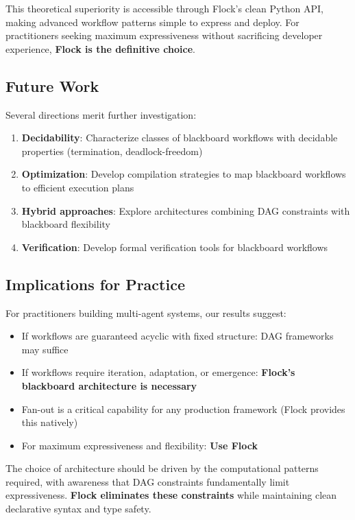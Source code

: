 \documentclass[11pt]{article}
\begin{document}
This theoretical superiority is accessible through Flock's clean Python API, making advanced workflow patterns simple to express and deploy. For practitioners seeking maximum expressiveness without sacrificing developer experience, \textbf{Flock is the definitive choice}.

\subsection{Future Work}

Several directions merit further investigation:
\begin{enumerate}
    \item \textbf{Decidability}: Characterize classes of blackboard workflows with decidable properties (termination, deadlock-freedom)
    \item \textbf{Optimization}: Develop compilation strategies to map blackboard workflows to efficient execution plans
    \item \textbf{Hybrid approaches}: Explore architectures combining DAG constraints with blackboard flexibility
    \item \textbf{Verification}: Develop formal verification tools for blackboard workflows
\end{enumerate}

\subsection{Implications for Practice}

For practitioners building multi-agent systems, our results suggest:
\begin{itemize}
    \item If workflows are guaranteed acyclic with fixed structure: DAG frameworks may suffice
    \item If workflows require iteration, adaptation, or emergence: \textbf{Flock's blackboard architecture is necessary}
    \item Fan-out is a critical capability for any production framework (Flock provides this natively)
    \item For maximum expressiveness and flexibility: \textbf{Use Flock}
\end{itemize}

The choice of architecture should be driven by the computational patterns required, with awareness that DAG constraints fundamentally limit expressiveness. \textbf{Flock eliminates these constraints} while maintaining clean declarative syntax and type safety.
\end{document}
